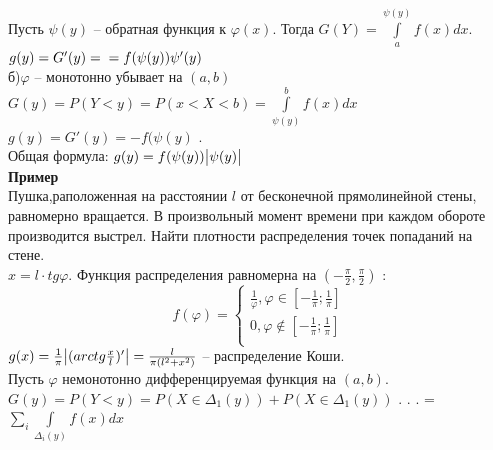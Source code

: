 \documentclass[russian, 12pt, fleqn]{article}
\begin{document}
\\
\\
Пусть $\psi(y)$ -- обратная функция к $\varphi(x)$.
Тогда $G(Y) =   \displaystyle{\int \limits_{a}^{\psi(y)}} f(x) dx$. $g(y) = G'(y) =\\= f(\psi(y))\psi'(y)$\\
б)$\varphi$ -- монотонно убывает на $(a, b)$\\
$G(y) = P(Y < y) = P(x< X < b) =  \displaystyle{\int \limits_{\psi(y)}^{b}} f(x) dx$\\
$g(y) = G'(y) = -f(\psi(y)$ .\\
Общая формула: $g(y) = f(\psi(y)) \abs{\psi(y)}$\\
\textbf{Пример} \\
Пушка,раположенная на  расстоянии $l$ от бесконечной прямолинейной стены, равномерно вращается. В произвольный момент времени при каждом обороте производится выстрел. Найти плотности распределения точек попаданий  на стене.\\
$x = l \cdot tg \varphi$. Функция распределения равномерна на $(-\frac{\pi}{2},\frac{\pi}{2})$ : \\
\begin{equation*} 
f(\varphi)=
 \begin{cases}
   \frac{1}{\varphi},  \varphi \in [-\frac{1}{\pi};\frac{1}{\pi}]\\
   0 , \varphi \notin [-\frac{1}{\pi};\frac{1}{\pi}]\\
 \end{cases}
\end{equation*}
$g(x) = \frac{1}{\pi} \abs{(arctg \frac{x}{l})'} = \frac{l}{\pi(l^2 + x^2)}$ -- распределение Коши.\\
Пусть $\varphi$ немонотонно дифференцируемая функция на $(a, b)$.\\
$G(y) = P(Y<y) = P(X \in \Delta_1(y)) + P(X \in \Delta_1(y))$ . . . = $\displaystyle{\sum_{i}}  \displaystyle{\int\limits_{\Delta_i(y)} } f(x) dx$\\
\end{document}
